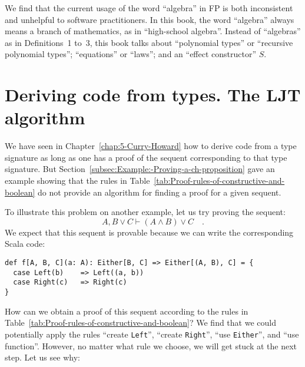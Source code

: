 We find that the current usage of the word \textsf{``}algebra\textsf{''} in FP is
both inconsistent and unhelpful to software practitioners. In this
book, the word \textsf{``}algebra\textsf{''} always means a branch of mathematics,
as in \textsf{``}high-school algebra\textsf{''}. Instead of \textsf{``}algebras\textsf{''} as in Definitions~1
to~3, this book talks about \textsf{``}polynomial types\textsf{''} or \textsf{``}recursive
polynomial types\textsf{''}; \textsf{``}equations\textsf{''} or \textsf{``}laws\textsf{''}; and an \textsf{``}effect
constructor\textsf{''} $S$. 

\chapter{Deriving code from types. The LJT algorithm\label{app:The-LJT-algorithm}}

We have seen in Chapter~\ref{chap:5-Curry-Howard} how to derive
code from a type signature as long as one has a proof of the sequent
corresponding to that type signature. But Section~\ref{subsec:Example:-Proving-a-ch-proposition}
gave an example showing that the rules in Table~\ref{tab:Proof-rules-of-constructive-and-boolean}
do not provide an algorithm for finding a proof for a given sequent.

To illustrate this problem on another example, let us try proving
the sequent:
\[
A,B\vee C\vdash(A\wedge B)\vee C\quad.
\]
We expect that this sequent is provable because we can write the corresponding
Scala code:
\begin{lstlisting}
def f[A, B, C](a: A): Either[B, C] => Either[(A, B), C] = {
  case Left(b)    => Left((a, b))
  case Right(c)   => Right(c)
}
\end{lstlisting}
How can we obtain a proof of this sequent according to the rules in
Table~\ref{tab:Proof-rules-of-constructive-and-boolean}? We find
that we could potentially apply the rules \textsf{``}create \lstinline!Left!\textsf{''},
\textsf{``}create \lstinline!Right!\textsf{''}, \textsf{``}use \lstinline!Either!\textsf{''}, and
\textsf{``}use function\textsf{''}. However, no matter what rule we choose, we will
get stuck at the next step. Let us see why:

